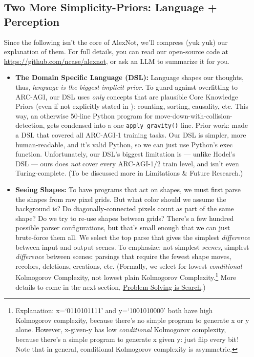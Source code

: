 \documentclass[11pt]{article}
\begin{document}
\subsection{Two More Simplicity-Priors: Language + Perception}

Since the following isn't the core of AlexNot, we'll compress (yuk yuk) our explanation of them. For full details, you can read our open-source code at \url{https://github.com/ncase/alexnot}, or ask an LLM to summarize it for you.

\begin{itemize}
    \item \textbf{The Domain Specific Language (DSL):} Language shapes our thoughts, thus, \textit{language is the biggest implicit prior}. To guard against overfitting to ARC-AGI, our DSL uses \textit{only} concepts that are plausible Core Knowledge Priors (even if not explicitly stated in \citet{core_knowledge_priors}): counting, sorting, causality, etc. This way, an otherwise 50-line Python program for move-down-with-collision-detection, gets condensed into a one \texttt{apply\_gravity()} line. Prior work: \citet{hodel_arc_dsl} made a DSL that covered all ARC-AGI-1 training tasks. Our DSL is simpler, more human-readable, and it's valid Python, so we can just use Python's exec function. Unfortunately, our DSL's biggest limitation is — unlike Hodel's DSL — ours does \textit{not} cover every ARC-AGI-1/2 train level, and isn't even Turing-complete. (To be discussed more in Limitations \& Future Research.)
    \item \textbf{Seeing Shapes:} To have programs that act on shapes, we must first parse the shapes from raw pixel grids. But what color should we assume the background is? Do diagonally-connected pixels count as part of the same shape? Do we try to re-use shapes between grids? There's a few hundred possible parser configurations, but that's small enough that we can just brute-force them all. We select the top parse that gives the simplest \textit{difference} between input and output scenes. To emphasize: not simplest \textit{scenes}, simplest \textit{difference} between scenes: parsings that require the fewest shape moves, recolors, deletions, creations, etc. (Formally, we select for lowest \textit{conditional} Kolmogorov Complexity, not lowest plain Kolmogorov Complexity.\footnote{Explanation: x=`0110101111' and y=`1001010000' both have high Kolmogorov complexity, because there's no simple program to generate x or y alone. However, x-given-y has low \textit{conditional} Kolmogorov complexity, because there's a simple program to generate x given y: just flip every bit! Note that in general, conditional Kolmogorov complexity is asymmetric.} More details to come in the next section, \hyperref[sec:search]{Problem-Solving is Search}.)
\end{itemize}
\end{document}
